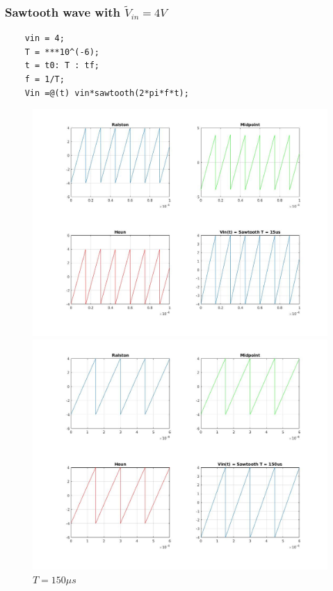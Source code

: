\documentclass[11pt,a4paper]{article}
\begin{document}
\pagebreak


\FloatBarrier
\subsubsection{Sawtooth wave with $\tilde{V}_{in} = 4V$}

\begin{verbatim}
    vin = 4;
    T = ***10^(-6);
    t = t0: T : tf;
    f = 1/T;
    Vin =@(t) vin*sawtooth(2*pi*f*t);
\end{verbatim}
\begin{figure}[h]
	\vspace{-5mm}
	\centering
	\includegraphics[width=.75\textwidth]{Ex1_Figs/saw15.jpg}
	\vspace{-6mm}
	\caption{$T = 15 \mu s$}
	\label{fig:RL4}
	\includegraphics[width=.75\textwidth]{Ex1_Figs/saw150.jpg}
	\vspace{-3mm}
	\caption{$T = 150 \mu s$}
	\label{fig:RL4}
\end{figure}
\end{document}

